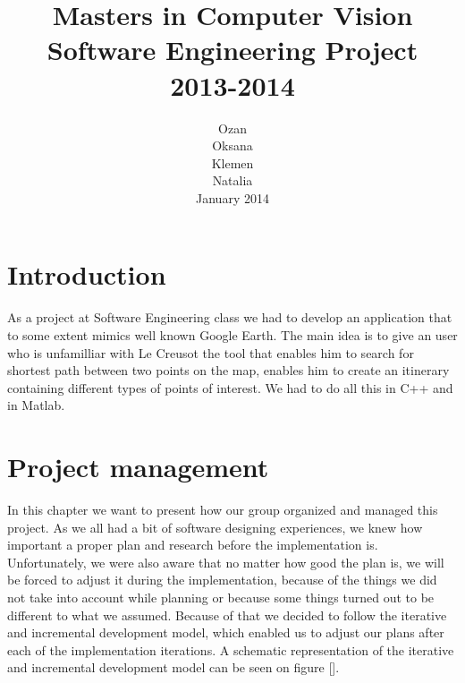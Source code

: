 \documentclass[reqno,openany,12pt]{amsbook}
\theoremstyle{definition}
\theoremstyle{remark}
\newcommand\ep{\epsilon}
\newcommand\R{\mathbb{R}}
\begin{document}
\title{Masters in Computer Vision\\Software Engineering Project\\2013-2014}
\author{Ozan\\Oksana\\Klemen\\Natalia\\
{\small
January 2014
}
}
\bigskip



%


\maketitle


 \setcounter{page}{0}


\tableofcontents


\chapter{Introduction}

As a project at Software Engineering class we had to develop an application that to some extent mimics well known Google Earth. The main idea is to give an user who is unfamilliar with Le Creusot the tool that enables him to search for shortest path between two points on the map, enables him to create an itinerary containing different types of points of interest. We had to do all this in C++ and in Matlab.

\chapter{Project management}
In this chapter we want to present how our group organized and managed this project. As we all had a bit of software designing experiences, we knew how important a proper plan and research before the implementation is. Unfortunately, we were also aware that no matter how good the plan is, we will be forced to adjust it during the implementation, because of the things we did not take into account while planning or because some things turned out to be different to what we assumed. Because of that we decided to follow the iterative and incremental development model, which enabled us to adjust our plans after each of the implementation iterations. A schematic representation of the iterative and incremental development model can be seen on figure []. 
\end{document}
